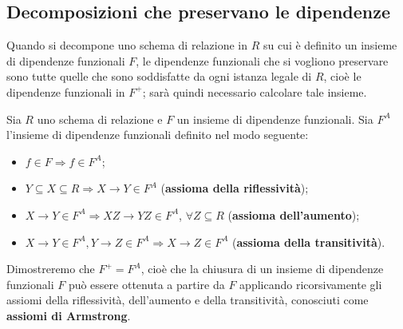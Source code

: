 \subsection{Decomposizioni che preservano le dipendenze}
Quando si decompone uno schema di relazione in $R$ su cui è definito un insieme di 
dipendenze funzionali $F$, le dipendenze funzionali che si vogliono preservare sono
tutte quelle che sono soddisfatte da ogni istanza legale di $R$, cioè le dipendenze
funzionali in $F^+$; sarà quindi necessario calcolare tale insieme.

\begin{defn}
Sia $R$ uno schema di relazione e $F$ un insieme di dipendenze funzionali. Sia $F^A$ l'insieme
di dipendenze funzionali definito nel modo seguente:
\begin{itemize}
 \item $f \in F \Rightarrow f \in F^A$;
 \item $Y \subseteq X \subseteq R \Rightarrow X\rightarrow Y \in F^A$ (\textbf{assioma della riflessività});
 \item $X \rightarrow Y \in F^A \Rightarrow XZ\rightarrow YZ \in F^A$, $\forall Z\subseteq R$ 
 (\textbf{assioma dell'aumento});
 \item $X \rightarrow Y \in F^A, Y \rightarrow Z \in F^A \Rightarrow X \rightarrow Z \in F^A$ 
 (\textbf{assioma della transitività}).
\end{itemize}
\end{defn}
Dimostreremo che $F^+=F^A$, cioè che la chiusura di un insieme di dipendenze funzionali $F$ può essere
ottenuta a partire da $F$ applicando ricorsivamente gli assiomi della riflessività, dell'aumento e della
transitività, conosciuti come \textbf{assiomi di Armstrong}.

